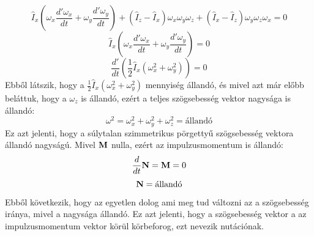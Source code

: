 \documentclass[a4paper,12pt]{article}
\begin{document}
\begin{equation}
    \hat{I}_x \left(\omega_x \frac{d'\omega_x}{dt} + \omega_y \frac{d'\omega_y}{dt}\right) + (\hat{I}_z - \hat{I}_x) \omega_x \omega_y \omega_z + (\hat{I}_x - \hat{I}_z) \omega_y \omega_z \omega_x = 0
\end{equation}
\begin{equation}
    \hat{I}_x \left(\omega_x \frac{d'\omega_x}{dt} + \omega_y \frac{d'\omega_y}{dt}\right) = 0
\end{equation}
\begin{equation}
    \frac{d'}{dt} \left(\frac{1}{2} \hat{I}_x (\omega_x^2 + \omega_y^2)\right) = 0
\end{equation}
Ebből látszik, hogy a $\frac{1}{2} \hat{I}_x (\omega_x^2 + \omega_y^2)$ mennyiség állandó, és mivel azt már előbb beláttuk, hogy a $\omega_z$ is állandó, ezért a teljes szögsebesség vektor nagysága is állandó:
\begin{equation}
    \omega^2 = \omega_x^2 + \omega_y^2 + \omega_z^2 = \text{állandó}
\end{equation}
Ez azt jelenti, hogy a súlytalan szimmetrikus pörgettyű szögsebesség vektora állandó nagyságú. Mivel $\bold{M}$ nulla, ezért az impulzusmomentum is állandó:
\begin{equation}
    \frac{d}{dt} \bold{N} = \bold{M} = 0
\end{equation}
\begin{equation}
    \bold{N} = \text{állandó}
\end{equation}
Ebből következik, hogy az egyetlen dolog ami meg tud változni az a szögsebesség iránya, mivel a nagysága állandó. Ez azt jelenti, hogy a szögsebesség vektor a az impulzusmomentum vektor körül körbeforog, ezt nevezik nutációnak.
\end{document}
